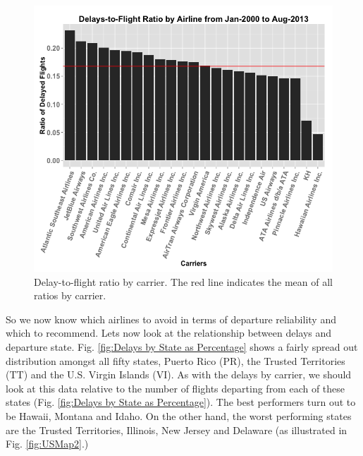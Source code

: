 \documentclass[11pt,twoside,titlepage]{article}
\begin{document}
\begin{figure}[h!]
        \centering
                \includegraphics[width=16cm]{Delayed_by_Airline2.png}
        \caption{Delay-to-flight ratio by carrier. The red line indicates the mean of all ratios by carrier.}\label{fig:Delays by Carrier as Percentage}
\end{figure}

So we now know which airlines to avoid in terms of departure reliability and which to recommend. Lets now look at the relationship between delays and departure state. Fig. \ref{fig:Delays by State as Percentage} shows a fairly spread out distribution amongst all fifty states, Puerto Rico (PR), the Trusted Territories (TT) and the U.S. Virgin Islands (VI). As with the delays by carrier, we should look at this data relative to the number of flights departing from each of these states (Fig. \ref{fig:Delays by State as Percentage}). The best performers turn out to be Hawaii, Montana and Idaho. On the other hand, the worst performing states are the Trusted Territories, Illinois, New Jersey and Delaware (as illustrated in Fig. \ref{fig:USMap2}.) 
\end{document}
